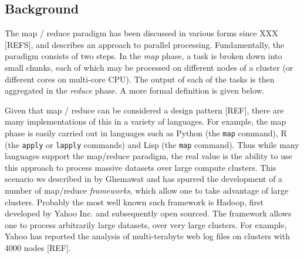 \documentclass[10pt]{bmc_article}
\newenvironment{bmcformat}{\begin{raggedright}\baselineskip20pt\sloppy\setboolean{publ}{false}}{\end{raggedright}\baselineskip20pt\sloppy}
\begin{document}
\begin{bmcformat}




\section*{Background}

The map / reduce paradigm has been discussed in various forms since
XXX [REFS], and describes an approach to parallel
processing. Fundamentally, the paradigm consists of two steps. In the
\textit{map} phase, a task is broken down into small chunks, each of
which may be processed on different nodes of a cluster (or different
cores on multi-core CPU). The output of each of the tasks is then
aggregated in the \textit{reduce} phase. A more formal definition is
given below.

Given that map / reduce can be considered a design pattern [REF],
there are many implementations of this in a variety of languages. For
example, the map phase is easily carried out in languages such as
Python (the \texttt{map} command), R (the \texttt{apply} or
\texttt{lapply} commands) and Lisp (the \texttt{map} command). Thus
while many languages support the map/reduce paradigm, the real value
is the ability to use this approach to process massive datasets over
large compute clusters. This scenario ws described in by Ghemawat and
has spurred the development of a number of map/reduce
\textit{frameworks}, which allow one to take advantage of large
clusters. Probably the most well known such framework is Hadoop, first
developed by Yahoo Inc. and subsequently open sourced. The framework
allows one to process arbitrarily large datasets, over very large
clusters. For example, Yahoo has reported the analysis of
multi-terabyte web log files on clusters with 4000 nodes [REF].


\end{bmcformat}
\end{document}
